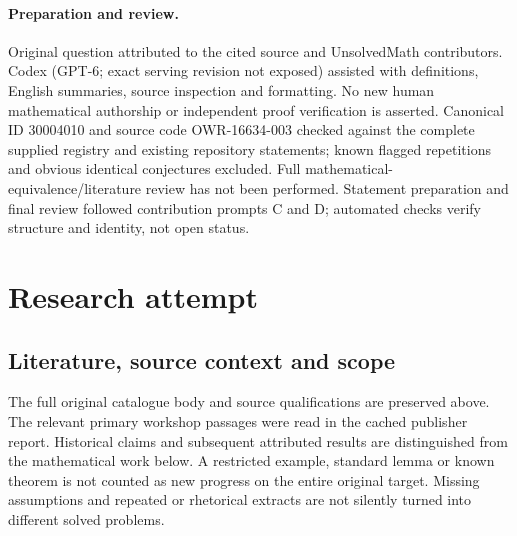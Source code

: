 \documentclass[11pt]{article}
\begin{document}
\paragraph{Preparation and review.}
Original question attributed to the cited source and UnsolvedMath contributors. Codex (GPT-6; exact serving revision not exposed) assisted with definitions, English summaries, source inspection and formatting. No new human mathematical authorship or independent proof verification is asserted. Canonical ID 30004010 and source code OWR-16634-003 checked against the complete supplied registry and existing repository statements; known flagged repetitions and obvious identical conjectures excluded. Full mathematical-equivalence/literature review has not been performed. Statement preparation and final review followed contribution prompts C and D; automated checks verify structure and identity, not open status.
\label{end:30004010}

\section{Research attempt}
\subsection{Literature, source context and scope}
The full original catalogue body and source qualifications are preserved above. The relevant primary workshop passages were read in the cached publisher report. Historical claims and subsequent attributed results are distinguished from the mathematical work below. A restricted example, standard lemma or known theorem is not counted as new progress on the entire original target. Missing assumptions and repeated or rhetorical extracts are not silently turned into different solved problems.
\end{document}
